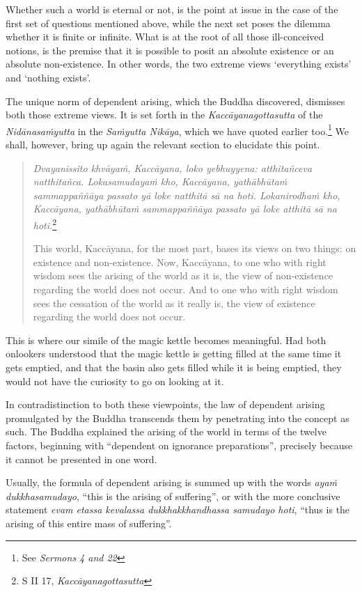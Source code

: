 Whether such a world is eternal or not, is the point at issue in the case of the first set of questions mentioned above, while the next set poses the dilemma whether it is finite or infinite. What is at the root of all those ill-conceived notions, is the premise that it is possible to posit an absolute existence or an absolute non-existence. In other words, the two extreme views `everything exists' and `nothing exists'.

The unique norm of dependent arising, which the Buddha discovered, dismisses both those extreme views. It is set forth in the \emph{Kaccāyanagottasutta} of the \emph{Nidānasaṁyutta} in the \emph{Saṁyutta Nikāya}, which we have quoted earlier too.\footnote{See \emph{Sermons 4 and 22}} We shall, however, bring up again the relevant section to elucidate this point.

\begin{quote}
\emph{Dvayanissito khvāyaṁ, Kaccāyana, loko yebhuyyena: atthitañceva natthitañca. Lokasamudayaṁ kho, Kaccāyana, yathābhūtaṁ sammappaññāya passato yā loke natthitā sā na hoti. Lokanirodhaṁ kho, Kaccāyana, yathābhūtaṁ sammappaññāya passato yā loke atthitā sā na hoti.}\footnote{S II 17, \emph{Kaccāyanagottasutta}}

This world, Kaccāyana, for the most part, bases its views on two things: on existence and non-existence. Now, Kaccāyana, to one who with right wisdom sees the arising of the world as it is, the view of non-existence regarding the world does not occur. And to one who with right wisdom sees the cessation of the world as it really is, the view of existence regarding the world does not occur.
\end{quote}

This is where our simile of the magic kettle becomes meaningful. Had both onlookers understood that the magic kettle is getting filled at the same time it gets emptied, and that the basin also gets filled while it is being emptied, they would not have the curiosity to go on looking at it.

In contradistinction to both these viewpoints, the law of dependent arising promulgated by the Buddha transcends them by penetrating into the concept as such. The Buddha explained the arising of the world in terms of the twelve factors, beginning with ``dependent on ignorance preparations'', precisely because it cannot be presented in one word.

Usually, the formula of dependent arising is summed up with the words \emph{ayaṁ dukkhasamudayo}, ``this is the arising of suffering'', or with the more conclusive statement \emph{evam etassa kevalassa dukkhakkhandhassa samudayo hoti}, ``thus is the arising of this entire mass of suffering''.

